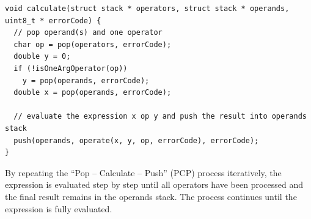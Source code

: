 \documentclass[a4paper, twoside]{report}
\begin{document}
\begin{verbatim}
void calculate(struct stack * operators, struct stack * operands, uint8_t * errorCode) {
  // pop operand(s) and one operator
  char op = pop(operators, errorCode);
  double y = 0;
  if (!isOneArgOperator(op))
    y = pop(operands, errorCode);
  double x = pop(operands, errorCode);

  // evaluate the expression x op y and push the result into operands stack
  push(operands, operate(x, y, op, errorCode), errorCode);
}
\end{verbatim}

By repeating the ``Pop -- Calculate -- Push'' (PCP) process iteratively, the expression is evaluated step by step until all operators have been processed and the final result remains in the operands stack. The process continues until the expression is fully evaluated.
\end{document}
